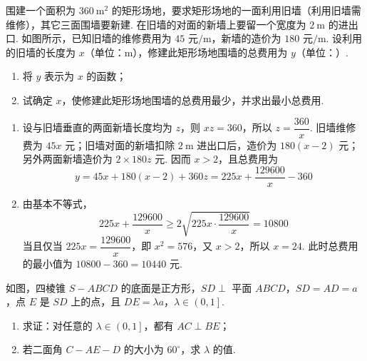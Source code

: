 \begin{problem}
围建一个面积为 \(360 \mathrm{~m}^{2}\) 的矩形场地，要求矩形场地的一面利用旧墙（利用旧墙需维修），其它三面围墙要新建. 在旧墙的对面的新墙上要留一个宽度为 \(2 \mathrm{~m}\) 的进出口. 如图所示，已知旧墙的维修费用为 \(45\text{ 元}/\mathrm{m}\)，新墙的造价为 \(180\text{ 元}/\mathrm{m}\). 设利用的旧墙的长度为 \(x\)（单位：\(\mathrm{m}\)），修建此矩形场地围墙的总费用为 \(y\)（单位：）.

\begin{enumerate}
\item 将 \(y\) 表示为 \(x\) 的函数；
\item 试确定 \(x\)，使修建此矩形场地围墙的总费用最少，并求出最小总费用.
\end{enumerate}

\end{problem}

\begin{solution}
\begin{enumerate}
\item 设与旧墙垂直的两面新墙长度均为 \(z\)，则 \(xz=360\)，所以 \(z=\dfrac{360}{x}\). 旧墙维修费为 \(45x\) 元；旧墙对面的新墙扣除 \(2\mathrm{~m}\) 进出口后，造价为 \(180(x-2)\) 元；另外两面新墙造价为 \(2\times180z\) 元. 因而 \(x>2\)，且总费用为
\[
y=45x+180(x-2)+360z=225x+\frac{129600}{x}-360
\]
\item 由基本不等式，
\[
225x+\frac{129600}{x}\geq2\sqrt{225x\cdot\frac{129600}{x}}=10800
\]
当且仅当 \(225x=\dfrac{129600}{x}\)，即 \(x^2=576\)，又 \(x>2\)，所以 \(x=24\). 此时总费用的最小值为 \(10800-360=10440\) 元.
\end{enumerate}
\end{solution}

\begin{problem}
如图，四棱锥 \(S - ABCD\) 的底面是正方形，\(SD \perp\) 平面 \(ABCD\)，\(SD = AD = a\)，点 \(E\) 是 \(SD\) 上的点，且 \(DE = \lambda a\)，\(\lambda \in \left(0,1\right]\).

\begin{enumerate}
\item 求证：对任意的 \(\lambda \in \left(0,1\right]\)，都有 \(AC \perp BE\)；
\item 若二面角 \(C - AE - D\) 的大小为 \(60^{\circ}\)，求 \(\lambda\) 的值.
\end{enumerate}

\end{problem}

